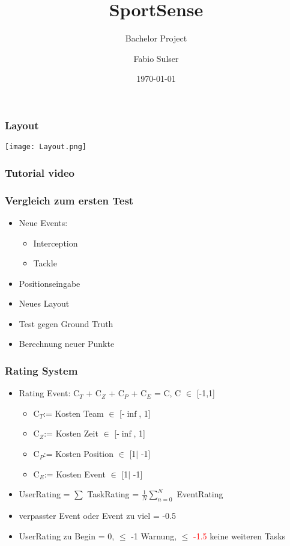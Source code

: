 \documentclass[]{beamer}
\title{SportSense}
\subtitle{Bachelor Project}
\author{Fabio Sulser}
\date{\today}
\begin{document}
\frame{\titlepage}

\begin{frame}
	\frametitle{Layout}
	\begin{center}
		\texttt{[image: Layout.png]}
	\end{center}
\end{frame}

\begin{frame}
	\frametitle{Tutorial video}
	\begin{center}
	\end{center}
\end{frame}



\begin{frame}
	\frametitle{Vergleich zum ersten Test}
	\begin{itemize}
		\item Neue Events:
		\begin{itemize}
			\item Interception
			\item Tackle
		\end{itemize}
		\item Positionseingabe
		\item Neues Layout
		\item Test gegen Ground Truth
		\item Berechnung neuer Punkte
	\end{itemize}
	
\end{frame}

\begin{frame}
	\frametitle{Rating System}
	\begin{itemize}
			\item Rating Event: C$_{T}$ + C$_{Z}$ + C$_{P}$ + C$_{E}$ = C, C $\in$ [-1,1]
			\begin{itemize}
				\item C$_{T}$:= Kosten Team $\in$ [-$\inf$, 1]
				\item C$_{Z}$:= Kosten Zeit $\in$ [-$\inf$, 1]
				\item C$_{P}$:= Kosten Position $\in$ [1$\mid$ -1]
				\item C$_{E}$:= Kosten Event $\in$ [1$\mid$ -1]
			\end{itemize}
			\item UserRating = $\sum$ TaskRating = $ \frac{1}{N} \sum\limits_{n=0}^N$ EventRating
			\item verpasster Event oder Event zu viel = -0.5
			\item UserRating zu Begin = 0, $\le$ -1 Warnung, $\le$ \textcolor{red}{-1.5} keine weiteren Tasks
		\end{itemize}
\end{frame}
\end{document}
